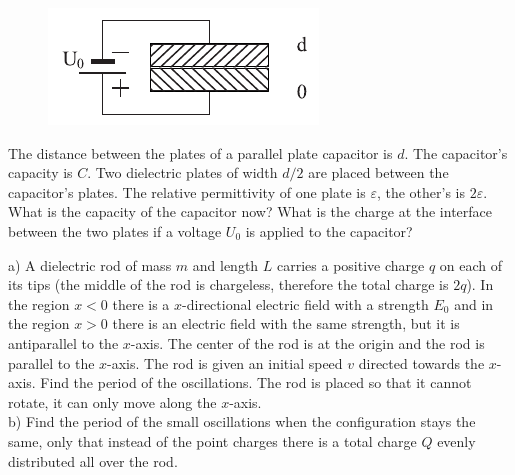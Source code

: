 \documentclass[11pt]{article}
\begin{document}

\probeng
\begin{figure}
	\vspace{-13pt}
	\includegraphics[width=\linewidth]{2017-lahg-07-res-cap2}
\end{figure}
The distance between the plates of a parallel plate capacitor is $d$. The capacitor’s capacity is $C$. Two dielectric plates of width $d/2$ are placed between the capacitor’s plates. The relative permittivity of one plate is $\varepsilon$, the other’s is $2\varepsilon$. What is the capacity of the capacitor now? What is the charge at the interface between the two plates if a voltage $U_0$ is applied to the capacitor?
\probend
\bigskip


\probeng
a) A dielectric rod of mass $m$ and length $L$ carries a positive charge $q$ on each of its tips (the middle of the rod is chargeless, therefore the total charge is $2q$). In the region $x<0$ there is a $x$-directional electric field with a strength $E_0$ and in the region $x>0$ there is an electric field with the same strength, but it is antiparallel to the $x$-axis. The center of the rod is at the origin and the rod is parallel to the $x$-axis. The rod is given an initial speed $v$ directed towards the $x$-axis. Find the period of the oscillations. The rod is placed so that it cannot rotate, it can only move along the $x$-axis.\\
b) Find the period of the small oscillations when the configuration stays the same, only that instead of the point charges there is a total charge $Q$ evenly distributed all over the rod.
\probend
\bigskip
\end{document}
